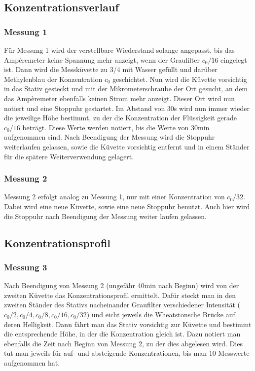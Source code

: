 \documentclass[12pt,a4paper,titlepage,headinclude,bibtotoc]{scrartcl}
\begin{document}
\subsection{Konzentrationsverlauf}
\subsubsection*{Messung 1}
\label{sec:messung1}
Für Messung 1 wird der verstellbare Wiederstand solange angepasst, bis das Ampèremeter keine Spannung mehr anzeigt, wenn der Graufilter $c_0/16$ eingelegt ist.
Dann wird die Messküvette zu 3/4 mit Wasser gefüllt und darüber Methylenblau der Konzentration $c_0$ geschichtet.
Nun wird die Küvette vorsichtig in das Stativ gesteckt und mit der Mikrometerschraube der Ort gesucht, an dem das Ampèremeter ebenfalls keinen Strom mehr anzeigt.
Dieser Ort wird nun notiert und eine Stoppuhr gestartet.
Im Abstand von 30s wird nun immer wieder die jeweilige Höhe bestimmt, zu der die Konzentration der Flüssigkeit gerade $c_0/16$ beträgt.
Diese Werte werden notiert, bis die Werte von 30min aufgenommen sind.
Nach Beendigung der Messung wird die Stoppuhr weiterlaufen gelassen, sowie die Küvette vorsichtig entfernt und in einem Ständer für die spätere Weiterverwendung gelagert.
\subsubsection*{Messung 2}
Messung 2 erfolgt analog zu Messung 1, nur mit einer Konzentration von $c_0/32$.
Dabei wird eine neue Küvette, sowie eine neue Stoppuhr benutzt.
Auch hier wird die Stoppuhr nach Beendigung der Messung weiter laufen gelassen.

\subsection{Konzentrationsprofil}
\subsubsection*{Messung 3}
Nach Beendigung von Messung 2 (ungefähr 40min nach Beginn) wird von der zweiten Küvette das Konzentrationsprofil ermittelt.
Dafür steckt man in den zweiten Ständer des Stativs nacheinander Graufilter verschiedener Intensität ($c_0/2, c_0/4, c_0/8, c_0/16, c_0/32$) und eicht jeweils die Wheatstonsche Brücke auf deren Helligkeit.
Dann fährt man das Stativ vorsichtig zur Küvette und bestimmt die entsprechende Höhe, in der die Konzentration gleich ist.
Dazu notiert man ebenfalls die Zeit nach Beginn von Messung 2, zu der dies abgelesen wird.
Dies tut man jeweils für auf- und absteigende Konzentrationen, bis man 10 Messwerte aufgenommen hat.
\end{document}
